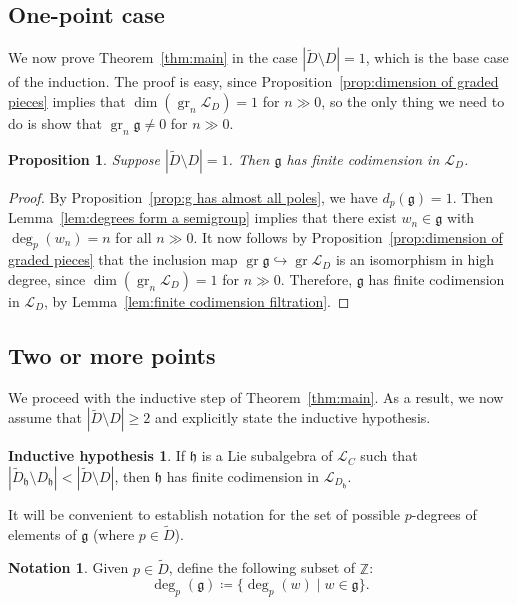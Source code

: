 \documentclass[12pt]{amsart}
\theoremstyle{plain}
\newtheorem{proposition}[theorem]{Proposition}
\theoremstyle{definition}
\newtheorem{notation}[theorem]{Notation}
\newtheorem*{IH}{Inductive hypothesis}
\numberwithin{equation}{section}
\def\g{\mathfrak{g}}
\def\h{\mathfrak{h}}
\def\L{\mathcal{L}}
\def\ZZ{\mathbb{Z}}
\DeclareMathOperator{\gr}{gr}
\begin{document}
\subsection{One-point case}

We now prove Theorem~\ref{thm:main} in the case $|\widetilde{D} \setminus D| = 1$, which is the base case of the induction. The proof is easy, since Proposition~\ref{prop:dimension of graded pieces} implies that $\dim(\gr_n \L_D) = 1$ for $n \gg 0$, so the only thing we need to do is show that $\gr_n \g \neq 0$ for $n \gg 0$.

\begin{proposition}\label{prop:one point with poles}
    Suppose $|\widetilde{D} \setminus D| = 1$. Then $\g$ has finite codimension in $\L_D$.
\end{proposition}
\begin{proof}
    By Proposition~\ref{prop:g has almost all poles}, we have $d_p(\g) = 1$. Then Lemma~\ref{lem:degrees form a semigroup} implies that there exist $w_n \in \g$ with $\deg_p(w_n) = n$ for all $n \gg 0$. It now follows by Proposition~\ref{prop:dimension of graded pieces} that the inclusion map $\gr \g \hookrightarrow \gr \L_D$ is an isomorphism in high degree, since $\dim(\gr_n \L_D) = 1$ for $n \gg 0$. Therefore, $\g$ has finite codimension in $\L_D$, by Lemma~\ref{lem:finite codimension filtration}.
\end{proof}

\subsection{Two or more points}

We proceed with the inductive step of Theorem~\ref{thm:main}. As a result, we now assume that $|\widetilde{D} \setminus D| \geq 2$ and explicitly state the inductive hypothesis.

\begin{IH}
    If $\h$ is a Lie subalgebra of $\L_C$ such that $|\widetilde{D}_\h \setminus D_\h| < |\widetilde{D} \setminus D|$, then $\h$ has finite codimension in $\L_{D_\h}$.
\end{IH}

It will be convenient to establish notation for the set of possible $p$-degrees of elements of $\g$ (where $p \in \widetilde{D}$).

\begin{notation}
    Given $p \in \widetilde{D}$, define the following subset of $\ZZ$:
    $$\deg_p(\g) \coloneqq \{\deg_p(w) \mid w \in \g\}.$$
\end{notation}
\end{document}
